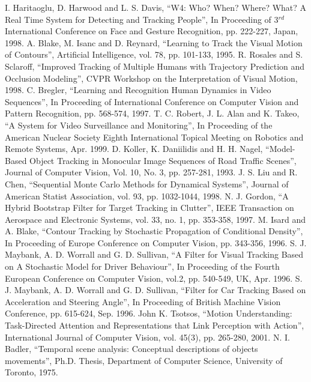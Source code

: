 \begin{thebibliography}{200}
 I. Haritaoglu, D. Harwood and L. S. Davis, ``W4: Who? When? Where? What? A Real Time System for Detecting and Tracking People'', In Proceeding of 3$^{rd}$ International Conference on Face and Gesture Recognition, pp. 222-227, Japan, 1998.
 A. Blake, M. Isanc and D. Reynard, ``Learning to Track the Visual Motion of Contours'', Artificial Intelligence, vol. 78, pp. 101-133, 1995.
 R. Rosales and S. Sclaroff, ``Improved Tracking of Multiple Humans with Trajectory Prediction and Occlusion Modeling'', CVPR Workshop on the Interpretation of Visual Motion, 1998.
 C. Bregler, ``Learning and Recognition Human Dynamics in Video Sequences'', In Proceeding of International Conference on Computer Vision and Pattern Recognition, pp. 568-574, 1997.
 T. C. Robert, J. L. Alan and K. Takeo, ``A System for Video Surveillance and Monitoring'', In Proceeding of the American Nuclear Society Eighth International Topical Meeting on Robotics and Remote Systems, Apr. 1999.
 D. Koller, K. Daniilidis and H. H. Nagel, ``Model-Based Object Tracking in Monocular Image Sequences of Road Traffic Scenes'', Journal of Computer Vision, Vol. 10, No. 3, pp. 257-281, 1993.
 J. S. Liu and R. Chen, ``Sequential Monte Carlo Methods for Dynamical Systems'', Journal of American Statist Association, vol. 93, pp. 1032-1044, 1998.
 N. J. Gordon, ``A Hybrid Bootstrap Filter for Target Tracking in Clutter'', IEEE Transaction on Aerospace and Electronic Systems, vol. 33, no. 1, pp. 353-358, 1997.
 M. Isard and A. Blake, ``Contour Tracking by Stochastic Propagation of Conditional Density'', In Proceeding of Europe Conference on Computer Vision, pp. 343-356, 1996.
 S. J. Maybank, A. D. Worrall and G. D. Sullivan, ``A Filter for Visual Tracking Based on A Stochastic Model for Driver Behaviour'', In Proceeding of the Fourth European Conference on Computer Vision, vol.2, pp. 540-549, UK, Apr. 1996.
 S. J. Maybank, A. D. Worrall and G. D. Sullivan, ``Filter for Car Tracking Based on Acceleration and Steering Angle'', In Proceeding of British Machine Vision Conference, pp. 615-624, Sep. 1996.
 John K. Tsotsos, ``Motion Understanding: Task-Directed Attention and Representations that Link Perception with Action'', International Journal of Computer Vision, vol. 45(3), pp. 265-280, 2001.
 N. I. Badler, ``Temporal scene analysis: Conceptual descriptions of objects movements'', Ph.D. Thesis, Department of Computer Science, University of Toronto, 1975.

\end{thebibliography}
